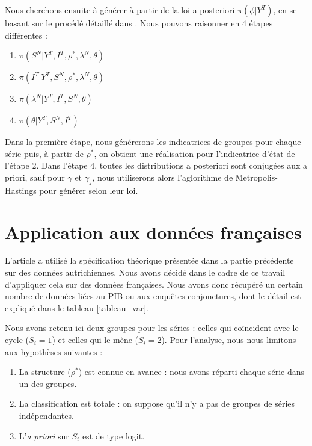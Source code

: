 \documentclass[10pt,french,french]{article}
\begin{document}
Nous cherchons ensuite à générer à partir de la loi a posteriori \(\pi(\phi|Y^T)\), en se basant sur le procédé détaillé dans \cite{FruhwirthKaufmann}. Nous pouvons raisonner en 4 étapes différentes :

\begin{enumerate}
\def\labelenumi{\arabic{enumi}.}
\item
  \(\pi(S^N|Y^T, I^T, \rho^*, \lambda^N, \theta)\)
\item
  \(\pi(I^T|Y^T, S^N, \rho^*, \lambda^N, \theta)\)
\item
  \(\pi(\lambda^N|Y^T, I^T, S^N, \theta)\)
\item
  \(\pi(\theta|Y^T,S^N,I^T)\)
\end{enumerate}

Dans la première étape, nous générerons les indicatrices de groupes pour chaque série puis, à partir de \(\rho^*\), on obtient une réalisation pour l'indicatrice d'état de l'étape 2. Dans l'étape 4, toutes les distributions a posteriori sont conjugées aux a priori, sauf pour \(\gamma\) et \(\gamma_z\), nous utiliserons alors l'aglorithme de Metropolis-Hastings pour générer selon leur loi.

\hypertarget{application-aux-donnuxe9es-franuxe7aises}{%
\section{Application aux données françaises}\label{application-aux-donnuxe9es-franuxe7aises}}

L'article \cite{Kaufmann} a utilisé la spécification théorique présentée dans la partie précédente sur des données autrichiennes. Nous avons décidé dans le cadre de ce travail d'appliquer cela sur des données françaises. Nous avons donc récupéré un certain nombre de données liées au PIB ou aux enquêtes conjonctures, dont le détail est expliqué dans le tableau \ref{tableau_var}.

Nous avons retenu ici deux groupes pour les séries : celles qui coïncident avec le cycle (\(S_i = 1\)) et celles qui le mène (\(S_i = 2\)). Pour l'analyse, nous nous limitons aux hypothèses suivantes :

\begin{enumerate}
\def\labelenumi{\arabic{enumi}.}
\item
  La structure (\(\rho^*\)) est connue en avance : nous avons réparti chaque série dans un des groupes.
\item
  La classification est totale : on suppose qu'il n'y a pas de groupes de séries indépendantes.
\item
  L'\emph{a priori} sur \(S_i\) est de type logit.
\end{enumerate}
\end{document}
